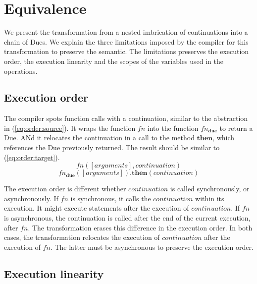\section{Equivalence} \label{section:equivalence}

We present the transformation from a nested imbrication of continuations into a chain of Dues.
We explain the three limitations imposed by the compiler for this transformation to preserve the semantic.
The limitations preserves the execution order, the execution linearity and the scopes of the variables used in the operations.

\subsection{Execution order}

The compiler spots function calls with a continuation, similar to the abstraction in (\ref{eq:order:source}).
It wraps the function $fn$ into the function $fn_\textbf{due}$ to return a Due.
ANd it relocates the continuation in a call to the method $\textbf{then}$, which references the Due previously returned.
The result should be similar to (\ref{eq:order:target}).
\begin{equation} \label{eq:order:source}
fn([arguments], continuation)
\end{equation}
\begin{equation} \label{eq:order:target}
fn_\textbf{due}([arguments])\textbf{.then}(continuation)
\end{equation}

The execution order is different whether $continuation$ is called synchronously, or asynchronously.
If $fn$ is synchronous, it calls the $continuation$ within its execution.
It might execute statements after the execution of $continuation$.
If $fn$ is asynchronous, the continuation is called after the end of the current execution, after $fn$.
The transformation erases this difference in the execution order.
In both cases, the transformation relocates the execution of $continuation$ after the execution of $fn$.
The latter must be asynchronous to preserve the execution order.

\subsection{Execution linearity}

